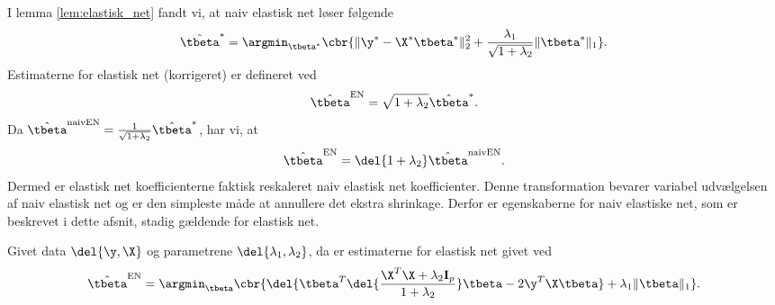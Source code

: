 I lemma \ref{lem:elastisk_net} fandt vi, at naiv elastisk net løser følgende 
\begin{align}
\hat{\tbeta}^* = \argmin_{\tbeta^*} \cbr{ \Vert \y^* - \X^* \tbeta^* \Vert_2^2 + \frac{\lambda_1}{\sqrt{1+\lambda_2}} \Vert \tbeta^* \Vert_1}. \label{eq:EN8}
\end{align}
Estimaterne for elastisk net (korrigeret) er defineret ved
\begin{align*}
\hat{\tbeta}^\text{EN} = \sqrt{1+\lambda_2} \hat{\tbeta}^*.
\end{align*}
Da \(\hat{\tbeta}^\text{naivEN} = \frac{1}{\sqrt{1+\lambda_2}} \hat{\tbeta}^*\), har vi, at
\begin{align*}
\hat{\tbeta}^\text{EN} = \del{1+\lambda_2} \hat{\tbeta}^\text{naivEN}.
\end{align*}
Dermed er elastisk net koefficienterne faktisk reskaleret naiv elastisk net koefficienter.
Denne transformation bevarer variabel udvælgelsen af naiv elastisk net og er den simpleste måde at annullere det ekstra shrinkage.
Derfor er egenskaberne for naiv elastiske net, som er beskrevet i dette afsnit, stadig gældende for elastisk net.
%
\begin{thm} \label{thm:elastisk_net2}
Givet data \(\del{\y, \X}\) og parametrene \(\del{\lambda_1, \lambda_2}\), da er estimaterne for elastisk net givet ved
\begin{align}
\hat{\tbeta}^\text{EN} = \argmin_{\tbeta} \cbr{ \del{\tbeta^T \del{\frac{\X^T \X + \lambda_2 \mathbf{I}_p}{1 + \lambda_2}} \tbeta - 2 \y^T \X \tbeta} + \lambda_1 \Vert \tbeta \Vert_1}. \label{eq:EN6}
\end{align}
\end{thm}
